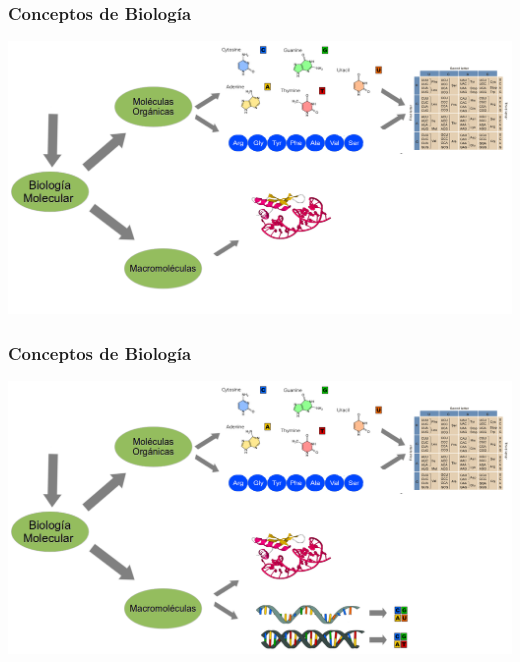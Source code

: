     \begin{frame}\frametitle{\textbf{Conceptos de Biología}}  
        \begin{center}
          \includegraphics[scale=.2]{images/biologia6.png}
        \end{center}
    \end{frame}

    \begin{frame}\frametitle{\textbf{Conceptos de Biología}}
        \begin{center}
          \includegraphics[scale=.2]{images/biologia7.png}
        \end{center}
    \end{frame}

